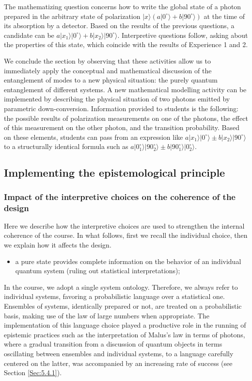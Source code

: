 \documentclass[twocolumn,secnumarabic,amssymb, nobibnotes, aps, prd, nofootinbib]{revtex4-2}
\begin{document}
The mathematizing question concerns how to write the global state of a photon prepared in the arbitrary state of polarization $|x\rangle(a|0^{\circ}\rangle + b|90^{\circ}\rangle)$ at the time of its absorption by a detector. Based on the results of the previous questions, a candidate can be $a|x_1\rangle|0^{\circ}\rangle + b|x_2\rangle|90^{\circ}\rangle$. Interpretive questions follow, asking about the properties of this state, which coincide with the results of Experience 1 and 2.

We conclude the section by observing that these activities allow us to immediately apply the conceptual and mathematical discussion of the entanglement of modes to a new physical situation: the purely quantum entanglement of different systems. A new mathematical modelling activity can be implemented by describing the physical situation of two photons emitted by parametric down-conversion. Information provided to students is the following: the possible results of polarization measurements on one of the photons, the effect of this measurement on the other photon, and the transition probability. Based on these elements, students can pass from an expression like $a|x_1\rangle|0^{\circ}\rangle \pm b|x_2\rangle|90^{\circ}\rangle$ to a structurally identical formula such as $a|0^{\circ}_1\rangle|90^{\circ}_2\rangle \pm b|90^{\circ}_1\rangle|0^{\circ}_2\rangle$.

\subsection{Implementing the epistemological principle} \label{Sec:3.5}

\subsubsection{Impact of the interpretive choices on the coherence of the design}  \label{Sec:3.5.1}
Here we describe how the interpretive choices are used to strengthen the internal coherence of the course. In what follows, first we recall the individual choice, then we explain how it affects the design.

\begin{itemize}
    \item a pure state provides complete information on the behavior of an individual quantum system (ruling out statistical interpretations);
\end{itemize}

In the course, we adopt a single system ontology. Therefore, we always refer to individual systems, favoring a probabilistic language over a statistical one. Ensembles of systems, identically prepared or not, are treated on a probabilistic basis, making use of the law of large numbers when appropriate. The implementation of this language choice played a productive role in the running of epistemic practices such as the interpretation of Malus's law in terms of photons, where a gradual transition from a discussion of quantum objects in terms oscillating between ensembles and individual systems, to a language carefully centered on the latter, was accompanied by an increasing rate of success (see Section \ref{Sec:5.4.1}).
\end{document}
